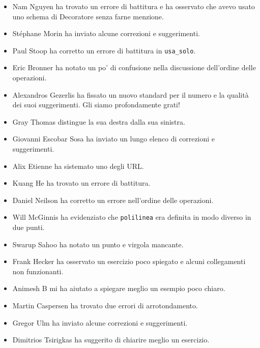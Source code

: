 \documentclass[10pt]{book}
\begin{document}
\begin{itemize}
\item Nam Nguyen ha trovato un errore di battitura e ha osservato che avevo usato uno schema di Decoratore senza farne menzione.

\item St\'{e}phane Morin ha inviato alcune correzioni e suggerimenti.

\item Paul Stoop ha corretto un errore di battitura in \verb+usa_solo+.

\item Eric Bronner ha notato un po' di confusione nella discussione dell'ordine delle operazioni.

\item Alexandros Gezerlis ha fissato un nuovo standard per il numero e la qualità dei suoi suggerimenti. Gli siamo profondamente grati!

\item Gray Thomas distingue la sua destra dalla sua sinistra.

\item Giovanni Escobar Sosa ha inviato un lungo elenco di correzioni e suggerimenti.

\item Alix Etienne ha sistemato uno degli URL.

\item Kuang He ha trovato un errore di battitura.

\item Daniel Neilson ha corretto un errore nell'ordine delle operazioni.

\item Will McGinnis ha evidenziato che {\tt polilinea} era definita in modo diverso in due punti.

\item Swarup Sahoo ha notato un punto e virgola mancante.

\item Frank Hecker ha osservato un esercizio poco spiegato e alcuni collegamenti non funzionanti.

\item Animesh B mi ha aiutato a spiegare meglio un esempio poco chiaro.

\item Martin Caspersen ha trovato due errori di arrotondamento.

\item Gregor Ulm ha inviato alcune correzioni e suggerimenti.

\item Dimitrios Tsirigkas ha suggerito di chiarire meglio un esercizio.


\end{itemize}
\end{document}
